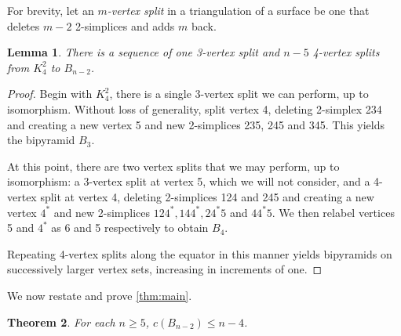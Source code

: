 \documentclass[11pt]{amsart}
\newtheorem{theorem}{Theorem}[section]
\newtheorem{lemma}[theorem]{Lemma}
\theoremstyle{definition}
\theoremstyle{remark}
\newcommand*{\defn}[1]{{\color{purple}\textit{#1}}}
\begin{document}
For brevity, let an \defn{$m$-vertex split} in a triangulation of a surface be one that deletes $m-2$ 2-simplices and adds $m$ back.

\begin{lemma}\label{lem:bipsplit}
    There is a sequence of one 3-vertex split and $n-5$ 4-vertex splits from $K_4^2$ to $B_{n-2}$.
\end{lemma}

\begin{proof}
    Begin with $K_4^2$, there is a single 3-vertex split we can perform, up to isomorphism.
    Without loss of generality, split vertex 4, deleting 2-simplex 234 and creating a new vertex 5 and new 2-simplices 235, 245 and 345.
    This yields the bipyramid $B_3$.

    At this point, there are two vertex splits that we may perform, up to isomorphism: a 3-vertex split at vertex 5, which we will not consider, and a 4-vertex split at vertex 4, deleting 2-simplices 124 and 245 and creating a new vertex $4^*$ and new 2-simplices $124^*, 144^*, 24^*5$ and $44^*5$.
    We then relabel vertices 5 and $4^*$ as 6 and 5 respectively to obtain $B_4$.

    Repeating 4-vertex splits along the equator in this manner yields bipyramids on successively larger vertex sets, increasing in increments of one.
\end{proof}

We now restate and prove \cref{thm:main}.

\begin{theorem}\label{thm:bipcount}
    For each $n\geq 5$, $c(B_{n-2})\leq n-4$.
\end{theorem}
\end{document}
